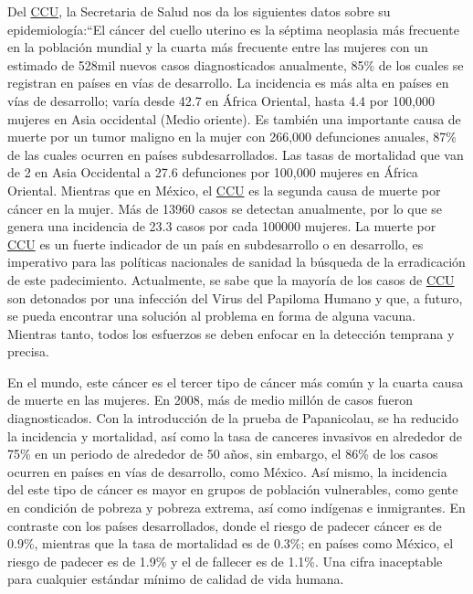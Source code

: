 Del \hyperlink{abbr}{CCU}, la Secretaria de Salud nos da los siguientes datos
sobre su epidemiología:“El cáncer del cuello uterino es la séptima neoplasia más
frecuente en la población mundial y la cuarta más frecuente entre las mujeres
con un estimado de 528mil nuevos casos diagnosticados anualmente, 85\% de los
cuales se registran en países en vías de desarrollo. La incidencia es más alta
en países en vías de desarrollo; varía desde 42.7 en África Oriental, hasta 4.4
por 100,000 mujeres en Asia occidental (Medio oriente). Es también una
importante causa de muerte por un tumor maligno en la mujer con 266,000
defunciones anuales, 87\% de las cuales ocurren en países subdesarrollados. Las
tasas de mortalidad que van de 2 en Asia Occidental a 27.6 defunciones por
100,000 mujeres en África Oriental. Mientras que en México, el
\hyperlink{abbr}{CCU} es la segunda causa de muerte por cáncer en la mujer. Más
de 13960 casos se detectan anualmente, por lo que se genera una incidencia de
23.3 casos por cada 100000 mujeres. La muerte por \hyperlink{abbr}{CCU} es un
fuerte indicador de un país en subdesarrollo o en desarrollo, es imperativo para
las políticas nacionales de sanidad la búsqueda de la erradicación de este
padecimiento. Actualmente, se sabe que la mayoría de los casos de
\hyperlink{abbr}{CCU} son detonados por una infección del Virus del Papiloma
Humano y que, a futuro, se pueda encontrar una solución al problema en forma de
alguna vacuna. Mientras tanto, todos los esfuerzos se deben enfocar en la
detección temprana y precisa.~\cite{SecretariadeSalud2015a}

En el mundo, este cáncer es el tercer tipo de cáncer más común y la cuarta causa
de muerte en las mujeres. En 2008, más de medio millón de casos fueron
diagnosticados. Con la introducción de la prueba de Papanicolau, se ha reducido
la incidencia y mortalidad, así como la tasa de canceres invasivos en alrededor
de 75\% en un periodo de alrededor de 50 años, sin embargo, el 86\% de los casos
ocurren en países en vías de desarrollo, como México. Así mismo, la incidencia
del este tipo de cáncer es mayor en grupos de población vulnerables, como gente
en condición de pobreza y pobreza extrema, así como indígenas e inmigrantes. En
contraste con los países desarrollados, donde el riesgo de padecer cáncer es de
0.9\%, mientras que la tasa de mortalidad es de 0.3\%; en países como México, el
riesgo de padecer es de 1.9\% y el de fallecer es de 1.1\%. Una cifra
inaceptable para cualquier estándar mínimo de calidad de vida humana.


